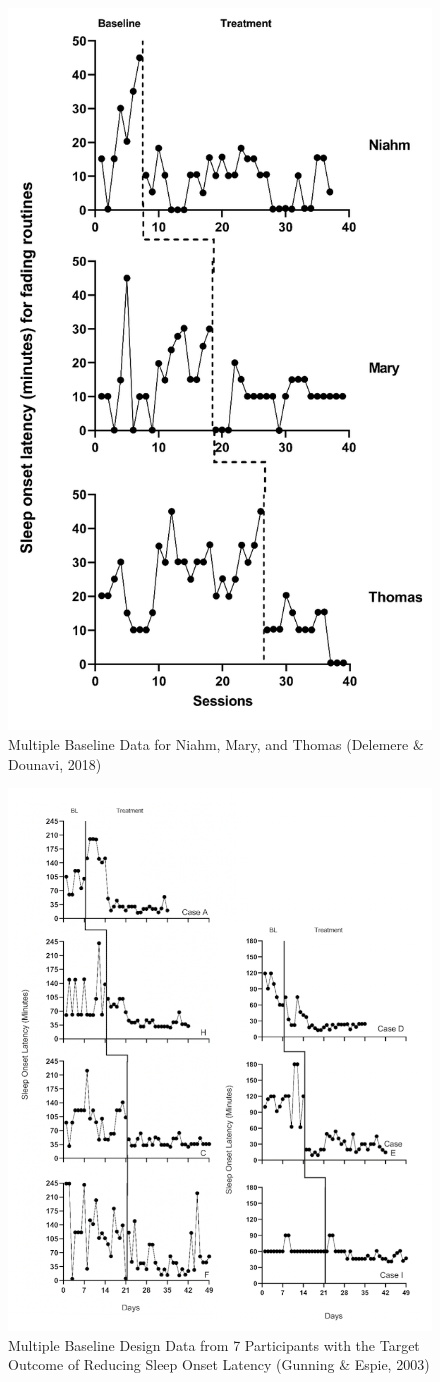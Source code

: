 \documentclass[
]{book}
\begin{document}
\begin{figure}
\includegraphics[width=0.6\linewidth]{images/DelemereDounavi2018_NiahmMaryThomas} \caption{Multiple Baseline Data for Niahm, Mary, and Thomas (Delemere \& Dounavi, 2018)}\label{fig:Delemere-2018-NMT}
\end{figure}

\begin{figure}
\includegraphics[width=0.6\linewidth]{images/Gunning&Espie2003} \caption{Multiple Baseline Design Data from 7 Participants with the Target Outcome of Reducing Sleep Onset Latency (Gunning \& Espie, 2003)}\label{fig:Gunning-2003}
\end{figure}
\end{document}
